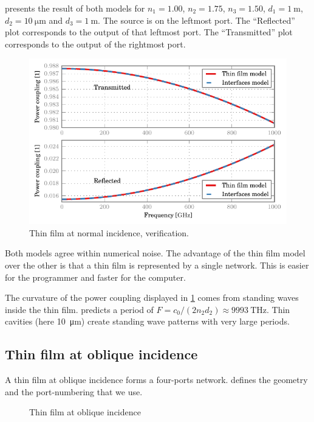  presents the result of both models for
$n_1=1.00$, $n_2=1.75$, $n_3=1.50$,
$d_1=\SI{1}{\meter}$, $d_2=\SI{10}{\micro\meter}$ and $d_3=\SI{1}{\meter}$.
The source is on the leftmost port.
The ``Reflected'' plot corresponds to the output of that leftmost port.
The ``Transmitted'' plot corresponds to the output of the rightmost port.
\begin{figure}[hbtp]
    \centering
    \includegraphics{thin_film_normal_verification.pdf}
    \caption{Thin film at normal incidence, verification.}
    \label{fig:thin_film_normal_verification}
\end{figure}

Both models agree within numerical noise.
The advantage of the thin film model over the other is that a thin film is represented by a single network.
This is easier for the programmer and faster for the computer.

The curvature of the power coupling displayed in \cref{fig:thin_film_normal_verification} comes from standing waves inside the thin film.
 predicts a period of $F = c_0 / (2 n_2 d_2) \approx \SI{9993}{\tera\hertz}$.
Thin cavities (here \SI{10}{\micro\meter}) create standing wave patterns with very large periods.



\subsection{Thin film at oblique incidence}
\label{sec:thin_film_at_oblique_incidence}

A thin film at oblique incidence forms a four-ports network.
 defines the geometry and the port-numbering that we use.
\begin{figure}[hbtp]
    \centering
    \caption{Thin film at oblique incidence}
    \label{fig:thin_film_oblique}
\end{figure}

